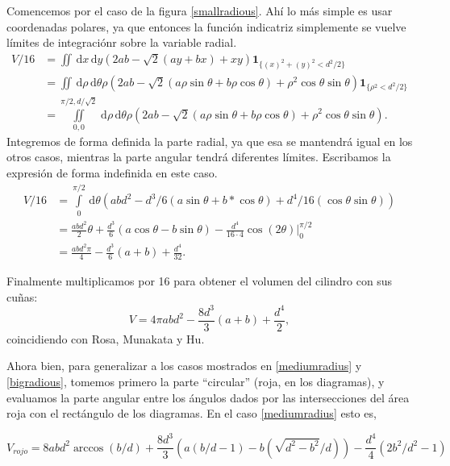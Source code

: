 \documentclass[a4paper,10pt]{article}
\newcommand{\rd}{\, \mathrm{d}}
\newcommand{\indicator}[1]{\mathbf{1}_{ \{   #1 \} } }
\begin{document}
Comencemos por el caso de la figura \ref{smallradious}. Ahí lo más simple
es usar coordenadas polares, ya que  entonces la función indicatriz simplemente
se vuelve límites de integraciónr sobre la variable radial.
\begin{equation}
\begin{split}
V/16 &=\iint \rd x \rd y (2ab-\sqrt{2}(ay+bx)+x y)
\indicator{(x)^2+(y)^2<d^2/2 }\\
&=\iint \rd \rho \rd \theta \rho (2ab
-\sqrt{2}(a\rho\sin\theta+b\rho\cos\theta)
+\rho^2 \cos\theta\sin\theta)
\indicator{\rho^2<d^2/2 }\\
&=\iint\limits_{0,0}^{\pi/2,d/\sqrt{2}} \rd \rho \rd \theta \rho (2ab
-\sqrt{2}(a\rho\sin\theta+b\rho\cos\theta)
+\rho^2 \cos\theta\sin\theta).
\end{split}
\end{equation}
Integremos de forma definida la parte radial, ya que esa se mantendrá
igual en los otros casos, mientras
 la parte angular tendrá diferentes límites. Escribamos la expresión
de forma indefinida en este caso.
\begin{equation}
\begin{split}
V/16 &=\int\limits_0^{\pi/2}  \rd \theta  
(abd^2 - d^3/6 (a\sin\theta+b*\cos\theta)+d^4/16 (\cos\theta\sin\theta))\\
&=\frac{abd^2}{2}\theta
+\frac{d^3}{6}(a\cos\theta-b\sin\theta)
-\frac{d^4}{16\cdot 4}\cos (2\theta) \bigg\vert_0^{\pi/2} \\
& =\frac{abd^2 \pi }{4}
-\frac{d^3}{6}(a+b)
+\frac{d^4}{32}.
\end{split}
\end{equation}

Finalmente multiplicamos por 16 para obtener el volumen del cilindro con
sus cuñas:
\begin{equation}\label{VolTotal}
V=4 \pi abd^2-\frac{8 d^3}{3}(a+b)+\frac{d^4}{2},
\end{equation} 
 coincidiendo con Rosa, Munakata y Hu.

Ahora bien, para generalizar a los casos mostrados en \ref{mediumradius} y 
\ref{bigradious}, tomemos primero la parte ``circular'' (roja, en los
diagramas), y evaluamos la parte angular entre los ángulos dados por las
intersecciones del área roja con el rectángulo de los diagramas.
En el caso \ref{mediumradius} esto es, 

\begin{equation}
V_{rojo} = 8abd^2\arccos(b/d)
+\frac{8 d^3}{3 }(a(b/d-1)-b(\sqrt{d^2-b^2}/d))
-\frac{d^4}{4} (2 b^2/d^2-1) 
\end{equation}
\end{document}
